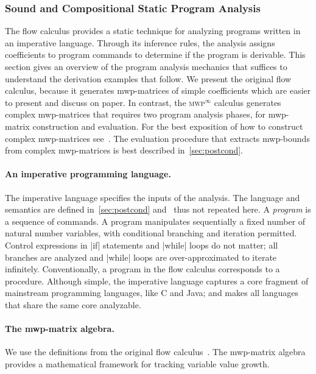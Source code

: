 \subsubsection{Sound and Compositional Static Program Analysis}\label{mwp-analysis}

The flow calculus provides a static technique for analyzing programs written in an imperative language.
Through its inference rules, the analysis assigns coefficients to program commands to determine if the program is derivable.
This section gives an overview of the program analysis mechanics that suffices to understand the derivation examples that follow.
We present the original flow calculus, because it generates mwp-matrices of simple coefficients which are easier to present and discuss on paper.
In contrast, the \textsc{mwp}\(^\infty\) calculus generates complex mwp-matrices that requires two program analysis phases, for mwp-matrix construction and evaluation.
For the best exposition of how to construct complex mwp-matrices see~.
The evaluation procedure that extracts mwp-bounds from complex mwp-matrices is best described in~\autoref{sec:postcond}.

\paragraph*{An imperative programming language.}
The imperative language specifies the inputs of the analysis.
The language and semantics are defined in~\autoref{sec:postcond} and~ thus not repeated here.
A \emph{program} is a sequence of commands.
A program manipulates sequentially a fixed number of natural number variables, with conditional branching and iteration permitted.
Control expressions in \pr|if| statements and \pr|while| loops do not matter;
all branches are analyzed and \pr|while| loops are over-approximated to iterate infinitely.
Conventionally, a program in the flow calculus corresponds to a procedure.
Although simple, the imperative language captures a core fragment of mainstream programming languages,
like C
and  Java;
and makes all languages that share the same core analyzable.

\paragraph*{The mwp-matrix algebra.}
We use the definitions from the original flow calculus~\cite{jones2009}.
The mwp-matrix algebra provides a mathematical framework for tracking variable value growth.

